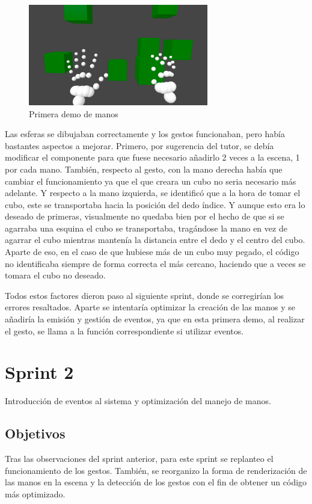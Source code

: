 \documentclass[a4paper, 12pt]{book}
\begin{document}
\begin{figure}[H] 
  \centering
  \includegraphics[width=0.7\textwidth]{img/primeras_manos.jpg} 
  \caption{Primera demo de manos}
  \label{fig:sprint1}
\end{figure}

Las esferas se dibujaban correctamente y los gestos funcionaban, pero había bastantes aspectos a mejorar. Primero, por sugerencia del tutor,
se debía modificar el componente para que fuese necesario añadirlo 2 veces a la escena, 1 por cada mano. También, respecto al gesto, con la mano derecha había que cambiar el funcionamiento
ya que el que creara un cubo no seria necesario más adelante. Y respecto a la mano izquierda, se identificó que a la hora de tomar el cubo, este se transportaba hacia la posición del dedo índice. 
Y aunque esto era lo deseado de primeras, visualmente no quedaba bien por el hecho de que si se agarraba una esquina el cubo se transportaba, tragándose la mano en vez de agarrar el cubo mientras mantenía la distancia entre el dedo y el centro del cubo. 
Aparte de eso, en el caso de que hubiese más de un cubo muy pegado, el código no identificaba siempre de forma correcta el más cercano, haciendo que a veces se tomara el cubo no deseado.

Todos estos factores dieron paso al siguiente sprint, donde se corregirían los errores resaltados. Aparte se intentaría optimizar la creación de las manos y se añadiría la emisión y gestión de eventos, ya que en esta primera demo, al realizar el gesto, se llama a la función correspondiente si utilizar eventos. 

\section{Sprint 2}
\label{sec:sprint2}
Introducción de eventos al sistema y optimización del manejo de manos. 

\subsection{Objetivos}
\label{subsec:objetivo-principal2}
Tras las observaciones del sprint anterior, para este sprint se replanteo el funcionamiento de los gestos. También, se reorganizo la forma de renderización de las manos en la escena y la detección de los gestos con el fin de obtener un código más optimizado. 
\end{document}
